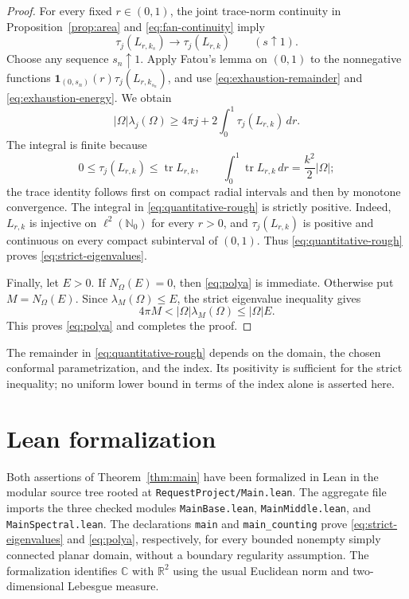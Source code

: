 \documentclass[11pt]{amsart}
\numberwithin{equation}{section}
\newcommand{\tr}{\operatorname{tr}}
\begin{document}
\begin{proof}
For every fixed $r\in(0,1)$, the joint trace-norm continuity in
Proposition~\ref{prop:area} and \eqref{eq:fan-continuity} imply
\[
 \tau_j(L_{r,k_s})\longrightarrow\tau_j(L_{r,k})
 \qquad(s\uparrow1).
\]
Choose any sequence $s_n\uparrow1$. Apply Fatou's lemma on $(0,1)$
to the nonnegative functions
$\mathbf1_{(0,s_n)}(r)\tau_j(L_{r,k_{s_n}})$, and use
\eqref{eq:exhaustion-remainder} and \eqref{eq:exhaustion-energy}.
We obtain
\begin{equation}\label{eq:quantitative-rough}
 |\Omega|\lambda_j(\Omega)
 \ge4\pi j+2\int_0^1\tau_j(L_{r,k})\,dr.
\end{equation}
The integral is finite because
\[
 0\le\tau_j(L_{r,k})\le\tr L_{r,k},\qquad
 \int_0^1\tr L_{r,k}\,dr=\frac{k^2}{2}|\Omega|;
\]
the trace identity follows first on compact radial intervals and
then by monotone convergence. The integral in
\eqref{eq:quantitative-rough} is strictly positive. Indeed,
$L_{r,k}$ is injective on $\ell^2(\mathbb N_0)$ for every $r>0$,
and $\tau_j(L_{r,k})$ is positive and continuous on every compact
subinterval of $(0,1)$. Thus \eqref{eq:quantitative-rough} proves
\eqref{eq:strict-eigenvalues}.

Finally, let $E>0$. If $N_\Omega(E)=0$, then \eqref{eq:polya} is
immediate. Otherwise put $M=N_\Omega(E)$. Since
$\lambda_M(\Omega)\le E$, the strict eigenvalue inequality gives
\[
 4\pi M<|\Omega|\lambda_M(\Omega)\le|\Omega|E.
\]
This proves \eqref{eq:polya} and completes the proof.
\end{proof}

The remainder in \eqref{eq:quantitative-rough} depends on the domain,
the chosen conformal parametrization, and the index. Its positivity
is sufficient for the strict inequality; no uniform lower bound
in terms of the index alone is asserted here.

\section{Lean formalization}\label{sec:lean-formalization}

Both assertions of Theorem~\ref{thm:main} have been formalized in Lean
in the modular source tree rooted at \texttt{RequestProject/Main.lean}.
The aggregate file imports the three checked modules
\texttt{MainBase.lean}, \texttt{MainMiddle.lean}, and
\texttt{MainSpectral.lean}. The declarations
\texttt{main} and \texttt{main\_counting} prove
\eqref{eq:strict-eigenvalues} and \eqref{eq:polya}, respectively, for
every bounded nonempty simply connected planar domain, without a
boundary regularity assumption. The formalization identifies
$\mathbb C$ with $\mathbb R^2$ using the usual Euclidean norm and
two-dimensional Lebesgue measure.
\end{document}
